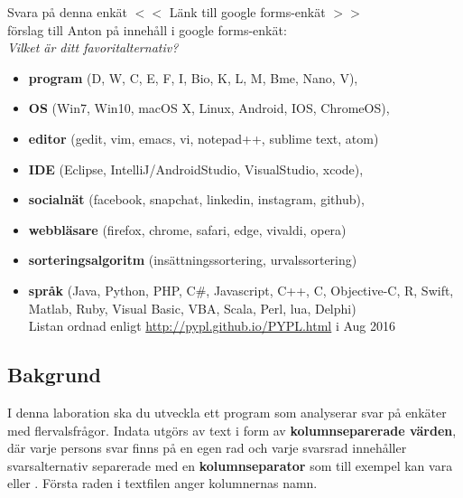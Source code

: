 \begin{Preparations}
\item {}
\item {}
\item \ReadTheLab
\item Svara på denna enkät $<<$ \TODO Länk till google forms-enkät $>>$  \\
\TODO förslag till Anton på innehåll i google forms-enkät:\\ \textit{Vilket är ditt favoritalternativ?}
\begin{itemize}[nolistsep,noitemsep]
\item \textbf{program} (D, W, C, E, F, I, Bio, K, L, M, Bme, Nano, V), 
\item \textbf{OS} (Win7, Win10, macOS X, Linux, Android, IOS, ChromeOS), 
\item \textbf{editor} (gedit, vim, emacs, vi, notepad++, sublime text, atom)
\item \textbf{IDE} (Eclipse, IntelliJ/AndroidStudio, VisualStudio, xcode), 
\item \textbf{socialnät} (facebook, snapchat, linkedin, instagram, github), 
\item \textbf{webbläsare} (firefox, chrome, safari, edge, vivaldi, opera)
\item \textbf{sorteringsalgoritm} (insättningssortering, urvalssortering)
\item \textbf{språk} (Java, Python, PHP, C\#, Javascript, C++, C, Objective-C, R, Swift, Matlab, Ruby, Visual Basic, VBA, Scala, Perl, lua, Delphi)  \\
Listan ordnad enligt \url{http://pypl.github.io/PYPL.html} i Aug 2016
\end{itemize}
\end{Preparations}

\subsection{Bakgrund}

I denna laboration ska du utveckla ett program som analyserar svar på enkäter med flervalsfrågor. Indata utgörs av text i form av \textbf{kolumnseparerade värden}, där varje persons svar finns på en egen rad och varje svarsrad innehåller svarsalternativ separerade med en \textbf{kolumnseparator} som till exempel kan vara \code{;} eller \code{\t}. Första raden i textfilen anger kolumnernas namn.

